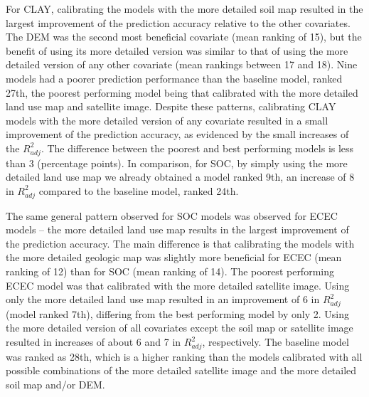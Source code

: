 For CLAY, calibrating the models with the more detailed soil map resulted in the largest improvement of the 
prediction accuracy relative to the other covariates. The DEM was the second most beneficial covariate (mean 
ranking of \num{15}), but the benefit of using its more detailed version was similar to that of using the more 
detailed version of any other covariate (mean rankings between \num{17} and \num{18}). Nine models had a 
poorer prediction performance than the baseline model, ranked \num{27}th, the poorest performing model being 
that calibrated with the more detailed land use map and satellite image. Despite these patterns, calibrating 
CLAY models with the more detailed version of any covariate resulted in a small improvement of the prediction 
accuracy, as evidenced by the small increases of the ${R}^{2}_{adj}$. The difference between the poorest and 
best performing models is less than \SI{3}{\pp} (percentage points). In comparison, for SOC, by simply 
using the more detailed land use map we already obtained a model ranked \num{9}th, an increase of \SI{8}{\pp} 
in ${R}^{2}_{adj}$ compared to the baseline model, ranked \num{24}th.

The same general pattern observed for SOC models was observed for ECEC models -- the more detailed land use 
map results in the largest improvement of the prediction accuracy. The main difference is that calibrating the 
models with the more detailed geologic map was slightly more beneficial for ECEC (mean ranking of \num{12}) 
than for SOC (mean ranking of \num{14}). The poorest performing ECEC model was that calibrated with the more 
detailed satellite image. Using only the more detailed land use map resulted in an improvement of \SI{6}{\pp} 
in ${R}^{2}_{adj}$ (model ranked \num{7}th), differing from the best performing model by only \SI{2}{\pp}. 
Using the more detailed version of all covariates except the soil map or satellite image resulted in increases 
of about \num{6} and \SI{7}{\pp} in ${R}^{2}_{adj}$, respectively. The baseline model was ranked as 
\num{28}th, which is a higher ranking than the models calibrated with all possible combinations of the more 
detailed satellite image and the more detailed soil map and/or DEM.

